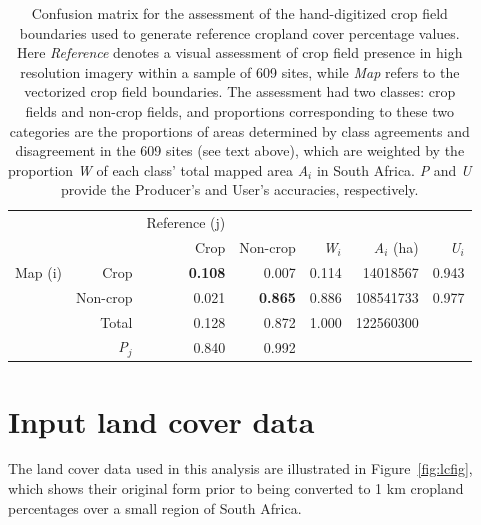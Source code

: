 \documentclass[12pt, titlepage]{article}
\begin{document}
\begin{table}[!ht]
\centering
\caption{Confusion matrix for the assessment of the hand-digitized crop field boundaries used to generate reference cropland cover percentage values. Here \emph{Reference} denotes a visual assessment of crop field presence in high resolution imagery within a sample of 609 sites, while \emph{Map} refers to the vectorized crop field boundaries. The assessment had two classes: crop fields and non-crop fields, and proportions corresponding to these two categories are the proportions of areas determined by class agreements and disagreement in the 609 sites (see text above), which are weighted by the proportion \emph{W} of each class' total mapped area \emph{A$_i$} in South Africa. \emph{P} and \emph{U} provide the Producer's and User's accuracies, respectively. }
\begin{tabular}{rrrrrrr}
  \hline
  & & Reference (j) & & & & \\\cline{3-7}
  & & Crop & Non-crop & \emph{W}$_i$ & \emph{A}$_i$ (ha) & \emph{U}$_i$ \\ 
  \hline
  Map (i) & Crop & \textbf{0.108} & 0.007 & 0.114 & 14018567 & 0.943 \\ 
  & Non-crop & 0.021 & \textbf{0.865} & 0.886 & 108541733 & 0.977 \\ 
  & Total & 0.128 & 0.872 & 1.000 & 122560300 &  \\ 
  & \emph{P}$_j$ & 0.840 & 0.992 &  &  &  \\ 
   \hline
\end{tabular}
\end{table}

\FloatBarrier
\section{\large Input land cover data}
The land cover data used in this analysis are illustrated in Figure~\ref{fig:lcfig}, which shows their original form prior to being converted to 1 km cropland percentages over a small region of South Africa.
\end{document}
